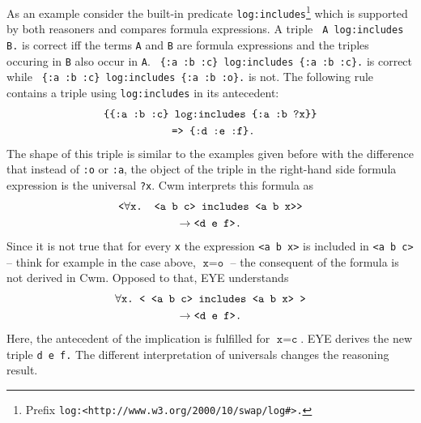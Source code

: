As an example consider the built-in predicate \texttt{log:includes}\footnote{Prefix \texttt{log:<http://www.w3.org/2000/10/swap/log\#>.}} %
which is supported by both reasoners and compares formula expressions. A triple \texttt{ A log:includes B.} is correct
iff the terms \texttt{A} and \texttt{B} are formula expressions and the triples occuring in \texttt{B} also occur in \texttt{A}. \texttt{ \{:a :b :c\} log:includes \{:a :b :c\}.} 
is correct 
while \texttt{ \{:a :b :c\} log:includes \{:a :b :o\}.}
is not.  %
The following rule contains a triple using \texttt{log:includes} in its antecedent: 
\begin{multline}\notag
 \texttt{\{\{:a :b :c\} log:includes \{:a :b ?x\}\}}\\
   \texttt{ => \{:d :e :f\}.} 
\end{multline}
The shape of this triple is similar to the examples 
given before with the difference that instead of \texttt{:o} or \texttt{:a}, the object of the triple in the right-hand side formula expression is the universal \texttt{?x}. 
Cwm interprets this formula as
\begin{multline}\notag
 \texttt{<}\forall \texttt{x. <a b c> includes <a b x>{}>}\\ \rightarrow \texttt{<d e f>.}
\end{multline}
Since it is not true that for every \texttt{x} the expression \texttt{<a~b~x>} is included in \texttt{<a b c>} -- think 
for example in the case above, $\texttt{x}=\texttt{o}$ -- %
the consequent of the formula is not derived in Cwm. Opposed to that, EYE understands
\begin{multline}\notag
 \forall \texttt{x.}\texttt{ <{} <a b c> includes <a b x> {}>}\\ \rightarrow \texttt{<d e f>.}
\end{multline}
Here, the antecedent of the implication is fulfilled for $\texttt{x}=\texttt{c}$. EYE derives the new triple \texttt{d~e~f.} 
The different interpretation of universals changes the reasoning result.


